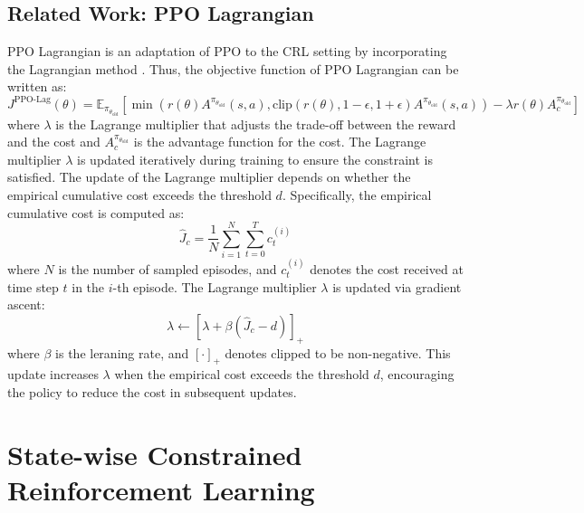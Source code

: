\subsection{Related Work: PPO Lagrangian}

PPO Lagrangian is an adaptation of PPO to the CRL setting by incorporating the Lagrangian method \cite{PPO-Lagrangian}.
Thus, the objective function of PPO Lagrangian can be written as:
\begin{equation}
  J^{\text{PPO-Lag}}(\theta) = \mathbb{E}_{\pi_{\theta_\text{old}}} \left[ \min \left( r(\theta) A^{\pi_{\theta_\text{old}}}(s, a), \text{clip}(r(\theta), 1 - \epsilon, 1 + \epsilon)A^{\pi_{\theta_\text{old}}}(s, a) \right) - \lambda r(\theta) A^{\pi_{\theta_\text{old}}}_c \right]
\end{equation}
where $\lambda$ is the Lagrange multiplier that adjusts the trade-off between the reward and the cost and  $A^{\pi_{\theta_\text{old}}}_c$ is the advantage function for the cost.
The Lagrange multiplier $\lambda$ is updated iteratively during training to ensure the constraint is satisfied.
The update of the Lagrange multiplier depends on whether the empirical cumulative cost exceeds the threshold $d$.
Specifically, the empirical cumulative cost is computed as:
\begin{equation}
  \hat{J}_c = \frac{1}{N} \sum^N_{i = 1} \sum^T_{t = 0}  c^{(i)}_t
\end{equation}
where $N$ is the number of sampled episodes, and $c^{(i)}_t$ denotes the cost received at time step $t$ in the $i$-th episode.
The Lagrange multiplier $\lambda$ is updated via gradient ascent:
\begin{equation}
  \lambda \leftarrow \left[ \lambda + \beta\left( \hat{J}_c - d \right) \right]_+
\end{equation}
where $\beta$ is the leraning rate, and $[\cdot]_+$ denotes clipped to be non-negative.
This update increases $\lambda$ when the empirical cost exceeds the threshold $d$, encouraging the policy to reduce the cost in subsequent updates.

\section{State-wise Constrained Reinforcement Learning} \label{chap2:sec5}

